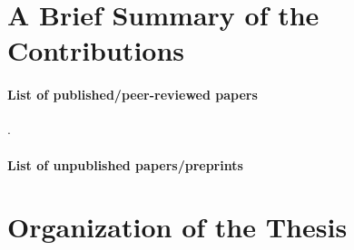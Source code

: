 \section{A Brief Summary of the Contributions}\label{sec:intro.contributions}

\paragraph{List of published/peer-reviewed papers}

\cite{shang2020t3c,shang2018adaptive,shang2019dttts,shang2019adaptive,degenne2020game,shang2020vector}.

\paragraph{List of unpublished papers/preprints}

\section{Organization of the Thesis}\label{sec:intro.organization}

\newpage


